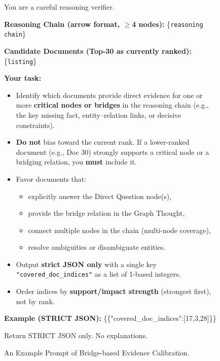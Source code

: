 \documentclass{article} %
\begin{document}
\begin{figure}[!b]
\begin{tcolorbox}[mybox={Prompts}]
You are a careful reasoning verifier.


\textbf{Reasoning Chain (arrow format, $\geq$4 nodes):}  
\{\texttt{reasoning chain}\}  

\textbf{Candidate Documents (Top-30 as currently ranked):}  
\{\texttt{listing}\}  

\textbf{Your task:}  
\begin{itemize}
  \item Identify which documents provide direct evidence for one or more \textbf{critical nodes or bridges} in the reasoning chain (e.g., the key missing fact, entity–relation links, or decisive constraints).  
  \item \textbf{Do not} bias toward the current rank. If a lower-ranked document (e.g., Doc 30) strongly supports a critical node or a bridging relation, you \textbf{must} include it.  
  \item Favor documents that:
    \begin{itemize}
      \item explicitly answer the Direct Question node(s),  
      \item provide the bridge relation in the Graph Thought,  
      \item connect multiple nodes in the chain (multi-node coverage),  
      \item resolve ambiguities or disambiguate entities.  
    \end{itemize}
  \item Output \textbf{strict JSON only} with a single key \texttt{"covered\_doc\_indices"} as a list of 1-based integers.  
  \item Order indices by \textbf{support/impact strength} (strongest first), not by rank.  
\end{itemize}

\textbf{Example (STRICT JSON):}  
\{\{"covered\_doc\_indices":[17,3,28]\}\}  

Return STRICT JSON only. No explanations.
\end{tcolorbox}
\caption{An Example Prompt of Bridge-based Evidence Calibration.}
\label{fig:gptcover}
\end{figure}
\end{document}
